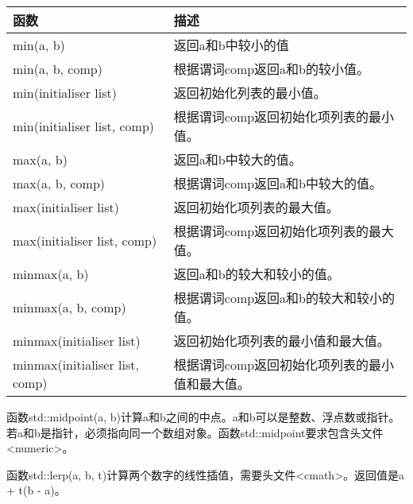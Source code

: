 \begin{longtable}[c]{|l|l|}
\hline
\textbf{函数}           & \textbf{描述}                                                                \\ \hline
\endfirsthead
%
\endhead
%
min(a, b)                   & 返回a和b中较小的值                                                \\ \hline
min(a, b, comp)             & 根据谓词comp返回a和b的较小值。               \\ \hline
min(initialiser list)       & 返回初始化列表的最小值。                                 \\ \hline
min(initialiser list, comp) & 根据谓词comp返回初始化项列表的最小值。 \\ \hline
max(a, b)                   & 返回a和b中较大的值。                                               \\ \hline
max(a, b, comp)             & 根据谓词comp返回a和b中较大的值。               \\ \hline
max(initialiser list)       & 返回初始化项列表的最大值。                                 \\ \hline
max(initialiser list, comp) & 根据谓词comp返回初始化项列表的最大值。 \\ \hline
minmax(a, b)                & 返回a和b的较大和较小的值。                                   \\ \hline
minmax(a, b, comp)          & 根据谓词comp返回a和b的较大和较小的值。   \\ \hline
minmax(initialiser list)    & 返回初始化项列表的最小值和最大值。                \\ \hline
minmax(initialiser list, comp) & 根据谓词comp返回初始化项列表的最小值和最大值。 \\ \hline
\end{longtable}


函数std::midpoint(a, b)计算a和b之间的中点。a和b可以是整数、浮点数或指针。若a和b是指针，必须指向同一个数组对象。函数std::midpoint要求包含头文件<numeric>。

函数std::lerp(a, b, t)计算两个数字的线性插值，需要头文件<cmath>。返回值是a + t(b - a)。


